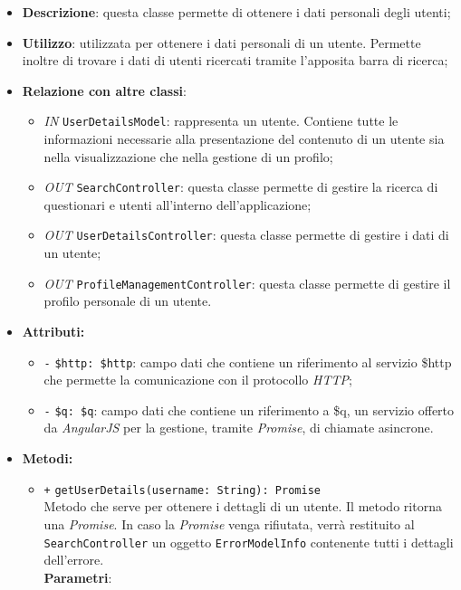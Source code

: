 \begin{itemize}
	\item \textbf{Descrizione}: questa classe permette di ottenere i dati personali degli utenti;
	\item \textbf{Utilizzo}: utilizzata per ottenere i dati personali di un utente. Permette inoltre di trovare i dati di utenti ricercati tramite l'apposita barra di ricerca;
	\item \textbf{Relazione con altre classi}:
	\begin{itemize}
		\item \textit{IN} \texttt{UserDetailsModel}: rappresenta un utente. Contiene tutte le informazioni necessarie alla
		presentazione del contenuto di un utente sia nella visualizzazione che nella gestione di un profilo; 
		\item \textit{OUT} \texttt{SearchController}: questa classe permette di gestire la ricerca di questionari e utenti all'interno dell'applicazione;
		\item \textit{OUT} \texttt{UserDetailsController}: questa classe permette di gestire i dati di un utente;
		\item \textit{OUT} \texttt{ProfileManagementController}: questa classe permette di gestire il profilo personale di un utente. 
	\end{itemize}
	\item \textbf{Attributi:}
	\begin{itemize}
		\item \texttt{-} \texttt{\$http: \$http}: campo dati che contiene un riferimento al servizio \$http che permette la comunicazione con il protocollo \textit{HTTP};
		\item \texttt{-} \texttt{\$q: \$q}: campo dati che contiene un riferimento a \$q, un servizio offerto da \textit{AngularJS} per la gestione, tramite \textit{Promise}, di chiamate asincrone.
	\end{itemize}
	\item \textbf{Metodi:}
	\begin{itemize}
		\item \texttt{+} \texttt{getUserDetails(username: String): Promise} \\ Metodo che serve per ottenere i dettagli di un utente. Il metodo ritorna una \textit{Promise}. In caso la \textit{Promise} venga rifiutata, verrà restituito al \texttt{SearchController} un oggetto \texttt{ErrorModelInfo} contenente tutti i dettagli dell'errore. \\
		\textbf{Parametri}:

\end{itemize}
\end{itemize}
